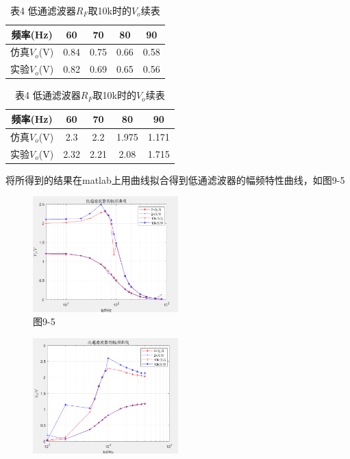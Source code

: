 \documentclass[a4paper,10pt,notitlepage]{article}
\begin{document}
\begin{enumerate}
\begin{table}[h]
\begin{minipage}{0.3\textwidth}
			\centering
			\begin{tabular}{|c|c|c|c|c|}
				\hline
				频率(Hz) & 60 & 70 & 80 & 90 \\
				\hline
				仿真$V_o$(V) & 0.84 & 0.75 & 0.66 & 0.58 \\
				\hline 
				实验$V_o$(V) & 0.82 & 0.69 & 0.65 & 0.56  \\
				\hline
			\end{tabular}
			\caption*{表3 低通滤波器$R_F$取2k时的$V_o$续表}
		\end{minipage}
		\qquad \qquad \qquad
		\begin{minipage}{0.3\textwidth}
			\centering
			\begin{tabular}{|c|c|c|c|c|}
				\hline
				频率(Hz) & 60 & 70 & 80 & 90 \\
				\hline
				仿真$V_o$(V) & 2.3 & 2.2 & 1.975 & 1.171 \\
				\hline 
				实验$V_o$(V) & 2.32 & 2.21 & 2.08 & 1.715  \\
				\hline
			\end{tabular}
			\caption*{表4 低通滤波器$R_F$取10k时的$V_o$续表}
		\end{minipage}
	\end{table}
	将所得到的结果在matlab上用曲线拟合得到低通滤波器的幅频特性曲线，如图9-5
	\begin{figure}[h]
		\centering
		\includegraphics[width=0.5\textwidth]{5.png}
		\caption*{图9-5}
	\end{figure}
	\begin{figure}[h]
		\centering
		\includegraphics[width=0.5\textwidth]{6.png}

\end{figure}
\end{enumerate}
\end{document}
